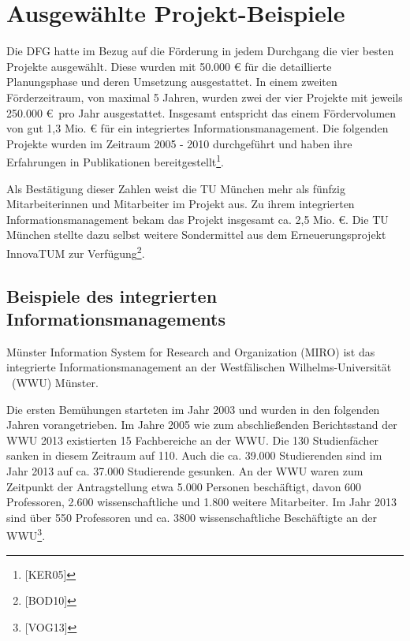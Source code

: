 \documentclass[a4paper]{article}
\begin{document}
\clearpage\setcounter{page}{1}\pagestyle{Standard}
\section{Ausgewählte Projekt-Beispiele}
\label{bkm:RefHeading24761162299686}{\sffamily
Die DFG hatte im Bezug auf die Förderung in jedem Durchgang die vier besten Projekte ausgewählt. Diese wurden mit 50.000
€ für die detaillierte Planungsphase und deren Umsetzung ausgestattet. In einem zweiten Förderzeitraum, von maximal 5
Jahren, wurden zwei der vier Projekte mit jeweils 250.000 €~pro Jahr ausgestattet.\textcolor{red}{ }Insgesamt
entspricht das einem Fördervolumen von gut 1,3 Mio. € für ein integriertes Informationsmanagement. Die folgenden
Projekte wurden im Zeitraum 2005 - 2010 durchgeführt und haben ihre Erfahrungen in Publikationen
bereitgestellt\footnote{[KER05]}.}


\bigskip

{\sffamily
Als Bestätigung dieser Zahlen weist die TU München mehr als f\"{u}nfzig Mitarbeiterinnen und Mitarbeiter im Projekt aus.
Zu ihrem integrierten Informationsmanagement bekam das Projekt insgesamt ca. 2,5 Mio. €. Die TU M\"{u}nchen stellte
dazu selbst weitere Sondermittel aus dem Erneuerungsprojekt InnovaTUM zur Verf\"{u}gung\footnote{[BOD10]}.}

\subsection{Beispiele des integrierten Informationsmanagements}
{\sffamily
Münster Information System for Research and Organization (MIRO) ist das integrierte Informationsmanagement an der
Westfälischen Wilhelms-Universität \ (WWU) Münster. }


\bigskip

{\sffamily
Die ersten Bemühungen starteten im Jahr 2003 und wurden in den folgenden Jahren vorangetrieben. Im Jahre 2005 wie zum
abschließenden Berichtsstand der WWU 2013 existierten 15 Fachbereiche an der WWU. Die 130 Studienfächer sanken in
diesem Zeitraum auf 110. Auch die ca. 39.000 Studierenden sind im Jahr 2013 auf ca. 37.000 Studierende gesunken. An der
WWU waren zum Zeitpunkt der Antragstellung etwa 5.000 Personen beschäftigt, davon 600 Professoren, 2.600
wissenschaftliche und 1.800 weitere Mitarbeiter. Im Jahr 2013 sind über 550 Professoren und ca. 3800 wissenschaftliche
Beschäftigte an der WWU\footnote{[VOG13]}.\newline
}
\end{document}
